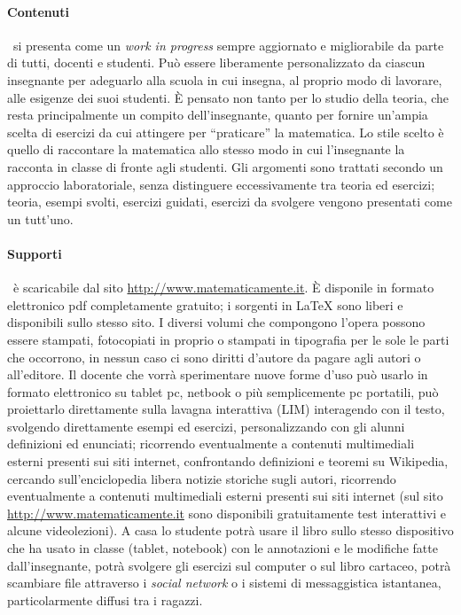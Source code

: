 \paragraph{Contenuti} \serie\ si presenta come un \textit{work in progress} sempre aggiornato e migliorabile da parte
di tutti, docenti e studenti. Può essere liberamente personalizzato da ciascun insegnante per adeguarlo alla
scuola in cui insegna, al proprio modo di lavorare, alle esigenze dei suoi studenti. È pensato non tanto per lo
studio della teoria, che resta principalmente un compito dell'insegnante, quanto per fornire un'ampia scelta di
esercizi da cui attingere per “praticare” la matematica. Lo stile scelto è quello di raccontare la matematica
allo stesso modo in cui l'insegnante la racconta in classe di fronte agli studenti. Gli
argomenti sono trattati secondo un approccio laboratoriale, senza distinguere eccessivamente tra teoria ed
esercizi; teoria, esempi svolti, esercizi guidati, esercizi da svolgere vengono presentati come un tutt’uno.

\paragraph{Supporti}
\serie\ è scaricabile dal sito \url{http://www.matematicamente.it}. È disponile in formato elettronico
pdf completamente gratuito; i sorgenti in {\LaTeX} sono liberi e disponibili sullo stesso sito. I diversi volumi che compongono l'opera
possono essere stampati, fotocopiati in proprio o stampati in tipografia per le sole le parti che occorrono, in
nessun caso ci sono diritti d’autore da pagare agli autori o all’editore. Il docente che vorrà sperimentare
nuove forme d'uso può usarlo in formato elettronico su tablet pc, netbook o più semplicemente pc portatili,
può proiettarlo direttamente sulla lavagna interattiva (LIM) interagendo con il testo, svolgendo direttamente
esempi ed esercizi, personalizzando con gli alunni definizioni ed enunciati; ricorrendo eventualmente a
contenuti multimediali esterni presenti sui siti internet, confrontando definizioni e teoremi su Wikipedia,
cercando sull'enciclopedia libera notizie storiche sugli autori, ricorrendo eventualmente a contenuti multimediali
esterni presenti sui siti internet (sul sito \url{http://www.matematicamente.it} sono disponibili gratuitamente test interattivi
e alcune videolezioni). A casa lo studente potrà usare il libro sullo
stesso dispositivo che ha usato in classe (tablet, notebook) con le annotazioni e le modifiche fatte
dall'insegnante, potrà svolgere gli esercizi sul computer o sul libro cartaceo, potrà scambiare file attraverso i \textit{social network}
o i sistemi di messaggistica istantanea, particolarmente diffusi tra i ragazzi.

